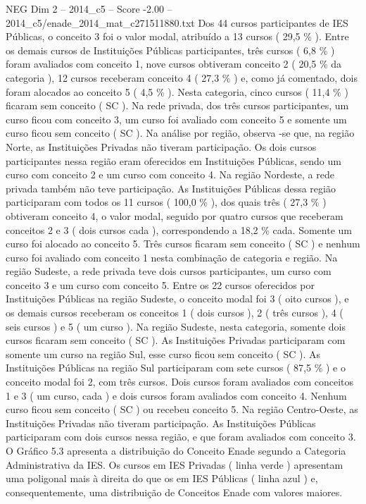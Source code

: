 \begin{textsample}{NEG Dim 2 – 2014\_c5 – Score -2.00 – 2014\_c5/enade\_2014\_mat\_c271511880.txt}
Dos 44 cursos participantes de IES Públicas, o conceito 3 foi o valor modal, atribuído a 13 cursos ( 29,5 \% ).
Entre os demais cursos de Instituições Públicas participantes, três cursos ( 6,8 \% ) foram avaliados com conceito 1, nove cursos obtiveram conceito 2 ( 20,5 \% da categoria ), 12 cursos receberam conceito 4 ( 27,3 \% ) e, como já comentado, dois foram alocados ao conceito 5 ( 4,5 \% ).
Nesta categoria, cinco cursos ( 11,4 \% ) ficaram sem conceito ( SC ).
Na rede privada, dos três cursos participantes, um curso ficou com conceito 3, um curso foi avaliado com conceito 5 e somente um curso ficou sem conceito ( SC ).
Na análise por região, observa -se que, na região Norte, as Instituições Privadas não tiveram participação.
Os dois cursos participantes nessa região eram oferecidos em Instituições Públicas, sendo um curso com conceito 2 e um curso com conceito 4.
Na região Nordeste, a rede privada também não teve participação.
As Instituições Públicas dessa região participaram com todos os 11 cursos ( 100,0 \% ), dos quais três ( 27,3 \% ) obtiveram conceito 4, o valor modal, seguido por quatro cursos que receberam conceitos 2 e 3 ( dois cursos cada ), correspondendo a 18,2 \% cada.
Somente um curso foi alocado ao conceito 5.
Três cursos ficaram sem conceito ( SC ) e nenhum curso foi avaliado com conceito 1 nesta combinação de categoria e região.
Na região Sudeste, a rede privada teve dois cursos participantes, um curso com conceito 3 e um curso com conceito 5.
Entre os 22 cursos oferecidos por Instituições Públicas na região Sudeste, o conceito modal foi 3 ( oito cursos ), e os demais cursos receberam os conceitos 1 ( dois cursos ), 2 ( três cursos ), 4 ( seis cursos ) e 5 ( um curso ).
Na região Sudeste, nesta categoria, somente dois cursos ficaram sem conceito ( SC ).
As Instituições Privadas participaram com somente um curso na região Sul, esse curso ficou sem conceito ( SC ).
As Instituições Públicas na região Sul participaram com sete cursos ( 87,5 \% ) e o conceito modal foi 2, com três cursos.
Dois cursos foram avaliados com conceitos 1 e 3 ( um curso, cada ) e dois cursos foram avaliados com conceito 4.
Nenhum curso ficou sem conceito ( SC ) ou recebeu conceito 5.
Na região Centro-Oeste, as Instituições Privadas não tiveram participação.
As Instituições Públicas participaram com dois cursos nessa região, e que foram avaliados com conceito 3.
O Gráfico 5.3 apresenta a distribuição do Conceito Enade segundo a Categoria Administrativa da IES.
Os cursos em IES Privadas ( linha verde ) apresentam uma poligonal mais à direita do que os em IES Públicas ( linha azul ) e, consequentemente, uma distribuição de Conceitos Enade com valores maiores.

\end{textsample}
